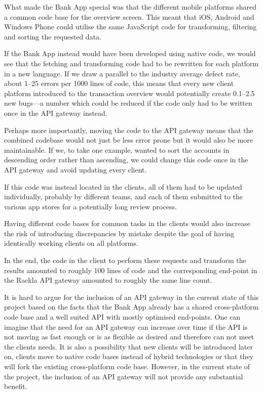 \documentclass{cslthse-msc}
\begin{document}
What made the Bank App special was that the different mobile platforms shared a common code base for the overview screen. This meant that iOS, Android and Windows Phone could utilise the same JavaScript code for transforming, filtering and sorting the requested data.

If the Bank App instead would have been developed using native code, we would see that the fetching and transforming code had to be rewritten for each platform in a new language. If we draw a parallel to the industry average defect rate, about 1--25 errors per 1000 lines of code\cite[page 521]{code_complete}, this means that every new client platform introduced to the transaction overview would potentially create 0.1--2.5 new bugs---a number which could be reduced if the code only had to be written once in the API gateway instead.

Perhaps more importantly, moving the code to the API gateway means that the combined codebase would not just be less error prone but it would also be more maintainable. If we, to take one example, wanted to sort the accounts in descending order rather than ascending, we could change this code once in the API gateway and avoid updating every client. 

If this code was instead located in the clients, all of them had to be updated individually, probably by different teams, and each of them submitted to the various app stores for a potentially long review process.

Having different code bases for common tasks in the clients would also increase the risk of introducing discrepancies by mistake despite the goal of having identically working clients on all platforms.

In the end, the code in the client to perform these requests and transform the results amounted to roughly 100 lines of code and the corresponding end-point in the Rackla API gateway amounted to roughly the same line count.

It is hard to argue for the inclusion of an API gateway in the current state of this project based on the facts that the Bank App already has a shared cross-platform code base and a well suited API with mostly optimised end-points. One can imagine that the need for an API gateway can increase over time if the API is not moving as fast enough or is as flexible as desired and therefore can not meet the clients needs. It is also a possibility that new clients will be introduced later on, clients move to native code bases instead of hybrid technologies or that they will fork the existing cross-platform code base. However, in the current state of the project, the inclusion of an API gateway will not provide any substantial benefit.
\end{document}
